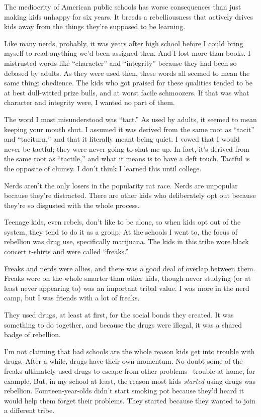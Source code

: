 The mediocrity of American public schools has worse consequences than
just making kids unhappy for six years. It breeds a rebelliousness that
actively drives kids away from the things they're supposed to be
learning.

Like many nerds, probably, it was years after high school before I could
bring myself to read anything we'd been assigned then. And I lost more
than books. I mistrusted words like ``character'' and ``integrity''
because they had been so debased by adults. As they were used then,
these words all seemed to mean the same thing: obedience. The kids who
got praised for these qualities tended to be at best dull-witted prize
bulls, and at worst facile schmoozers. If that was what character and
integrity were, I wanted no part of them.

The word I most misunderstood was ``tact.'' As used by adults, it seemed
to mean keeping your mouth shut. I assumed it was derived from the same
root as ``tacit'' and ``taciturn,'' and that it literally meant being
quiet. I vowed that I would never be tactful; they were never going to
shut me up. In fact, it's derived from the same root as ``tactile,'' and
what it means is to have a deft touch. Tactful is the opposite of
clumsy. I don't think I learned this until college.

Nerds aren't the only losers in the popularity rat race. Nerds are
unpopular because they're distracted. There are other kids who
deliberately opt out because they're so disgusted with the whole
process.

Teenage kids, even rebels, don't like to be alone, so when kids opt out
of the system, they tend to do it as a group. At the schools I went to,
the focus of rebellion was drug use, specifically marijuana. The kids in
this tribe wore black concert t-shirts and were called ``freaks.''

Freaks and nerds were allies, and there was a good deal of overlap
between them. Freaks were on the whole smarter than other kids, though
never studying (or at least never appearing to) was an important tribal
value. I was more in the nerd camp, but I was friends with a lot of
freaks.

They used drugs, at least at first, for the social bonds they created.
It was something to do together, and because the drugs were illegal, it
was a shared badge of rebellion.

I'm not claiming that bad schools are the whole reason kids get into
trouble with drugs. After a while, drugs have their own momentum. No
doubt some of the freaks ultimately used drugs to escape from other
problems-- trouble at home, for example. But, in my school at least, the
reason most kids \emph{started} using drugs was rebellion.
Fourteen-year-olds didn't start smoking pot because they'd heard it
would help them forget their problems. They started because they wanted
to join a different tribe.

